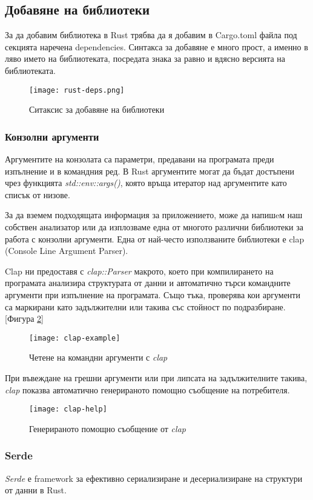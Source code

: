 \subsection{Добавяне на библиотеки}
За да добавим библиотека в Rust трябва да я добавим в Cargo.toml файла под
секцията наречена dependencies. Синтакса за добавяне е много прост, а именно в
ляво името на библиотеката, посредата знака за равно и вдясно версията на
библиотеката.
\begin{figure}[!htb]
  \texttt{[image: rust-deps.png]}
  \centering
  \caption{Ситаксис за добавяне на библиотеки}
  \label{fig:rust-deps}
\end{figure}

\subsubsection{Конзолни аргументи}
Аргументите на конзолата са параметри, предавани на програмата преди изпълнение
и в командния ред. В Rust аргументите могат да бъдат достъпени чрез
функцията \textit{std::env::args()}, която връща итератор над аргументите като списък от
низове.

За да вземем подходящата информация за приложението, може да напишeм наш собствен
анализатор или да изплозваме една от многото различни библиотеки за работа с
конзолни аргументи. Една от най-често използваните библиотеки е clap (Console Line
Argument Parser).

Clap ни предоставя с \textit{clap::Parser} макрото, което при компилирането на програмата
анализира структурата от данни и автоматично търси командните аргументи при
изпълнение на програмата. Също тъка, проверява кои аргументи са маркирани като
задължителни или такива със стойност по подразбиране. [Фигура \ref{fig:clap-example}]
\begin{figure}[!htb]
  \texttt{[image: clap-example]}
  \centering
  \caption{Четене на командни аргументи с \textit{clap}}
  \label{fig:clap-example}
\end{figure}

При въвеждане на грешни аргументи или при липсата на задължителните такива, \textit{clap}
показва автоматично генерираното помощно съобщение на потребителя.
\begin{figure}[!htb]
  \texttt{[image: clap-help]}
  \centering
  \caption{Генерираното помощно съобщение от \textit{clap}}
  \label{fig:clap-help}
\end{figure}

\subsubsection{Serde}
\textit{Serde} е framework за ефективно сериализиране и десериализиране на структури от данни в Rust.

